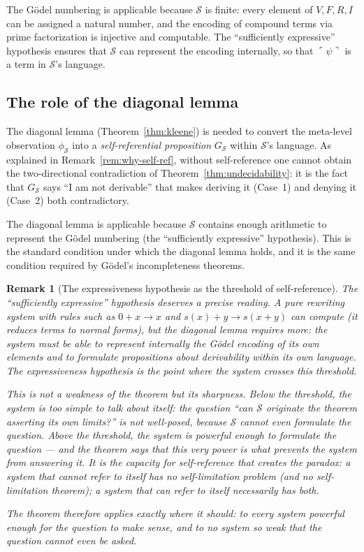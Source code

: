\documentclass[11pt]{article}
\newtheorem{remark}[theorem]{Remark}
\begin{document}
The G\"odel numbering is applicable because $\mathcal{S}$ is finite:
every element of $V, F, R, I$ can be assigned a natural number, and the
encoding of compound terms via prime factorization is injective and
computable. The ``sufficiently expressive'' hypothesis
ensures that $\mathcal{S}$ can represent the encoding internally, 
so that $\ulcorner\psi\urcorner$ is a term in $\mathcal{S}$'s language.

\subsection{The role of the diagonal lemma}

The diagonal lemma (Theorem~\ref{thm:kleene}) is needed to convert the
meta-level observation $\phi_{\mathcal{S}}$ into a \emph{self-referential
proposition} $G_{\mathcal{S}}$ within $\mathcal{S}$'s language. As
explained in Remark~\ref{rem:why-self-ref}, without self-reference one
cannot obtain the two-directional contradiction of
Theorem~\ref{thm:undecidability}: it is the fact that $G_{\mathcal{S}}$
says ``I am not derivable'' that makes deriving it (Case~1) and denying
it (Case~2) both contradictory.

The diagonal lemma is applicable because $\mathcal{S}$ contains enough
arithmetic to represent the G\"odel numbering (the ``sufficiently
expressive'' hypothesis). This is the standard condition under which the
diagonal lemma holds, and it is the same condition required by G\"odel's
incompleteness theorems.

\begin{remark}[The expressiveness hypothesis as the threshold of
self-reference]
\label{rem:threshold}
The ``sufficiently expressive'' hypothesis deserves a precise reading.
A pure rewriting system with rules such as $0 + x \to x$ and
$s(x) + y \to s(x+y)$ can \emph{compute} (it reduces terms to normal
forms), but the diagonal lemma requires more: the system must be able to
\emph{represent internally} the G\"odel encoding of its own elements and
to formulate propositions about derivability within its own language.
The expressiveness hypothesis is the point where the system crosses this
threshold.

This is not a weakness of the theorem but its \emph{sharpness}. Below
the threshold, the system is too simple to talk about itself: the
question ``can $\mathcal{S}$ originate the theorem asserting its own
limits?'' is not well-posed, because $\mathcal{S}$ cannot even formulate
the question. Above the threshold, the system is powerful enough to
formulate the question --- and the theorem says that this very power
is what prevents the system from answering it. It is the capacity for
self-reference that creates the paradox: a system that cannot refer to
itself has no self-limitation problem (and no self-limitation theorem);
a system that can refer to itself necessarily has both.

The theorem therefore applies exactly where it should: to every system
powerful enough for the question to make sense, and to no system so
weak that the question cannot even be asked.
\end{remark}
\end{document}
